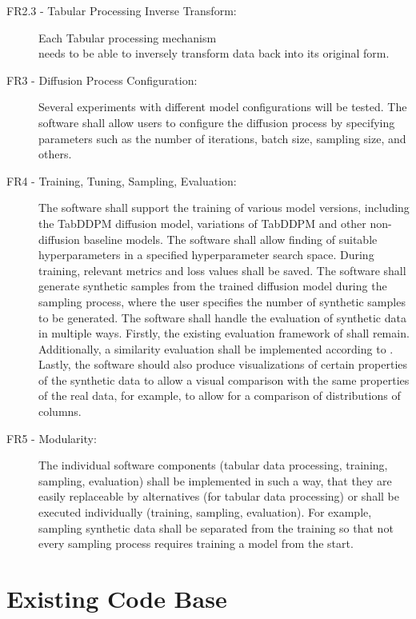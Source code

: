 \begin{description}
		\item[FR2.3 - Tabular Processing Inverse Transform:]
		Each Tabular processing mechanism \\needs to be able to inversely transform data back into its original form.

		\item[FR3 - Diffusion Process Configuration:]
		Several experiments with different \gls{model} configurations will be tested.
		The software shall allow users to configure the diffusion process by specifying parameters such as the number of iterations, batch size, sampling size, and others.

		\item[FR4 - Training, Tuning, Sampling, Evaluation:]
		The software shall support the training of various \gls{model} versions, including the TabDDPM diffusion \gls{model}, variations of TabDDPM and other non-diffusion baseline \glspl{model}.
		The software shall allow finding of suitable hyperparameters in a specified hyperparameter search space.
		During training, relevant metrics and loss values shall be saved.
		The software shall generate synthetic samples from the trained diffusion \gls{model} during the sampling process, where the user specifies the number of synthetic samples to be generated.
		The software shall handle the evaluation of synthetic data in multiple ways.
		Firstly, the existing evaluation framework of \cite{kotelnikov2022TabDDPMModellingTabular} shall remain.
		Additionally, a similarity evaluation shall be implemented according to \cite{chundawat2022UniversalMetricRobust}.
		Lastly, the software should also produce visualizations of certain properties of the synthetic data to allow a visual comparison with the same properties of the real data, for example, to allow for a comparison of distributions of columns.

	\item[FR5 - Modularity:]
		The individual software components (tabular data processing, training, sampling, evaluation) shall be implemented in such a way,
		that they are easily replaceable by alternatives (for tabular data processing) or shall be executed individually (training, sampling, evaluation).
		For example, sampling synthetic data shall be separated from the training so that not every sampling process requires training a \gls{model} from the start.
\end{description}


\section{Existing Code Base}
\label{ch:conceptualDesign-existingCodeBase}

